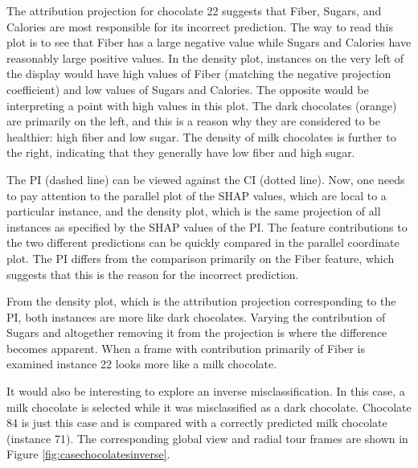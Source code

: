 \documentclass[11pt,twoside]{article}
\begin{document}
The attribution projection for chocolate 22 suggests that Fiber, Sugars, and Calories are most responsible for its incorrect prediction. The way to read this plot is to see that Fiber has a large negative value while Sugars and Calories have reasonably large positive values. In the density plot, instances on the very left of the display would have high values of Fiber (matching the negative projection coefficient) and low values of Sugars and Calories. The opposite would be interpreting a point with high values in this plot. The dark chocolates (orange) are primarily on the left, and this is a reason why they are considered to be healthier: high fiber and low sugar. The density of milk chocolates is further to the right, indicating that they generally have low fiber and high sugar.

The PI (dashed line) can be viewed against the CI (dotted line). Now, one needs to pay attention to the parallel plot of the SHAP values, which are local to a particular instance, and the density plot, which is the same projection of all instances as specified by the SHAP values of the PI. The feature contributions to the two different predictions can be quickly compared in the parallel coordinate plot. The PI differs from the comparison primarily on the Fiber feature, which suggests that this is the reason for the incorrect prediction.

From the density plot, which is the attribution projection corresponding to the PI, both instances are more like dark chocolates. Varying the contribution of Sugars and altogether removing it from the projection is where the difference becomes apparent. When a frame with contribution primarily of Fiber is examined instance 22 looks more like a milk chocolate.

It would also be interesting to explore an inverse misclassification. In this case, a milk chocolate is selected while it was misclassified as a dark chocolate. Chocolate 84 is just this case and is compared with a correctly predicted milk chocolate (instance 71). The corresponding global view and radial tour frames are shown in Figure \ref{fig:casechocolatesinverse}.
\end{document}
